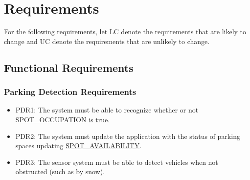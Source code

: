 \documentclass[]{article}
\begin{document}
	

\section{Requirements}
For the following requirements, let LC denote the requirements that are likely to change and UC denote the requirements that are unlikely to change.
\subsection{Functional Requirements}
	\subsubsection{Parking Detection Requirements}
	\begin{itemize}
		\item PDR1: The system must be able to recognize whether or not \hyperlink{SPOCC}{SPOT\_OCCUPATION} is true.
		\item PDR2: The system must update the application with the status of parking spaces updating \hyperlink{PSAVAIL}{SPOT\_AVAILABILITY}.
		\item PDR3: The sensor system must be able to detect vehicles when not obstructed (such as by snow).
	\end{itemize}
\end{document}
